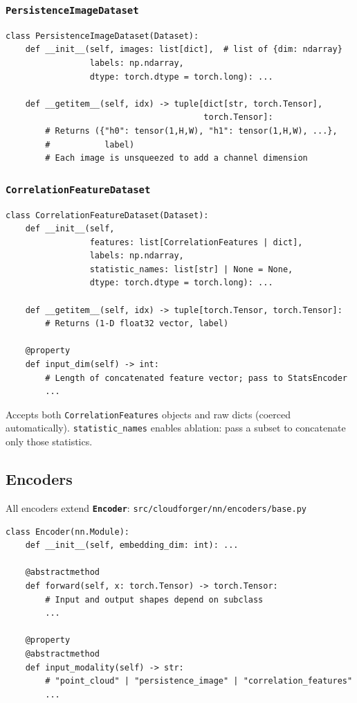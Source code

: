 \documentclass[11pt, a4paper]{article}
\newcommand{\code}[1]{\texttt{#1}}
\newcommand{\pyfile}[1]{\texttt{\small #1}}
\newcommand{\typename}[1]{\textbf{\texttt{#1}}}
\begin{document}
\subsubsection{\typename{PersistenceImageDataset}}

\begin{lstlisting}
class PersistenceImageDataset(Dataset):
    def __init__(self, images: list[dict],  # list of {dim: ndarray}
                 labels: np.ndarray,
                 dtype: torch.dtype = torch.long): ...

    def __getitem__(self, idx) -> tuple[dict[str, torch.Tensor],
                                        torch.Tensor]:
        # Returns ({"h0": tensor(1,H,W), "h1": tensor(1,H,W), ...},
        #           label)
        # Each image is unsqueezed to add a channel dimension
\end{lstlisting}

\subsubsection{\typename{CorrelationFeatureDataset}}

\begin{lstlisting}
class CorrelationFeatureDataset(Dataset):
    def __init__(self,
                 features: list[CorrelationFeatures | dict],
                 labels: np.ndarray,
                 statistic_names: list[str] | None = None,
                 dtype: torch.dtype = torch.long): ...

    def __getitem__(self, idx) -> tuple[torch.Tensor, torch.Tensor]:
        # Returns (1-D float32 vector, label)

    @property
    def input_dim(self) -> int:
        # Length of concatenated feature vector; pass to StatsEncoder
        ...
\end{lstlisting}

Accepts both \code{CorrelationFeatures} objects and raw dicts
(coerced automatically).
\code{statistic\_names} enables ablation: pass a subset to concatenate
only those statistics.

\subsection{Encoders}

All encoders extend \typename{Encoder}:
\pyfile{src/cloudforger/nn/encoders/base.py}

\begin{lstlisting}
class Encoder(nn.Module):
    def __init__(self, embedding_dim: int): ...

    @abstractmethod
    def forward(self, x: torch.Tensor) -> torch.Tensor:
        # Input and output shapes depend on subclass
        ...

    @property
    @abstractmethod
    def input_modality(self) -> str:
        # "point_cloud" | "persistence_image" | "correlation_features"
        ...
\end{lstlisting}
\end{document}

